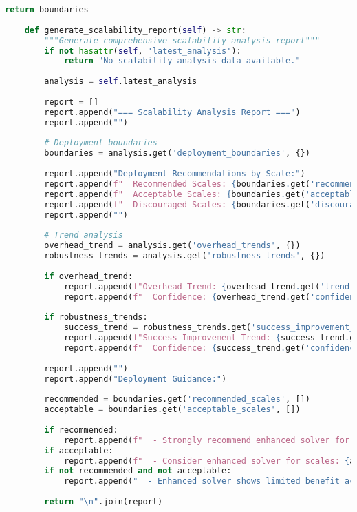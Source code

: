 \begin{lstlisting}[language=Python, caption=Scalability Analysis for Deployment Planning]
        return boundaries
    
    def generate_scalability_report(self) -> str:
        """Generate comprehensive scalability analysis report"""
        if not hasattr(self, 'latest_analysis'):
            return "No scalability analysis data available."
        
        analysis = self.latest_analysis
        
        report = []
        report.append("=== Scalability Analysis Report ===")
        report.append("")
        
        # Deployment boundaries
        boundaries = analysis.get('deployment_boundaries', {})
        
        report.append("Deployment Recommendations by Scale:")
        report.append(f"  Recommended Scales: {boundaries.get('recommended_scales', [])}")
        report.append(f"  Acceptable Scales: {boundaries.get('acceptable_scales', [])}")
        report.append(f"  Discouraged Scales: {boundaries.get('discouraged_scales', [])}")
        report.append("")
        
        # Trend analysis
        overhead_trend = analysis.get('overhead_trends', {})
        robustness_trends = analysis.get('robustness_trends', {})
        
        if overhead_trend:
            report.append(f"Overhead Trend: {overhead_trend.get('trend', 'unknown')}")
            report.append(f"  Confidence: {overhead_trend.get('confidence', 0.0):.2f}")
        
        if robustness_trends:
            success_trend = robustness_trends.get('success_improvement_trend', {})
            report.append(f"Success Improvement Trend: {success_trend.get('trend', 'unknown')}")
            report.append(f"  Confidence: {success_trend.get('confidence', 0.0):.2f}")
        
        report.append("")
        report.append("Deployment Guidance:")
        
        recommended = boundaries.get('recommended_scales', [])
        acceptable = boundaries.get('acceptable_scales', [])
        
        if recommended:
            report.append(f"  - Strongly recommend enhanced solver for scales: {recommended}")
        if acceptable:
            report.append(f"  - Consider enhanced solver for scales: {acceptable}")
        if not recommended and not acceptable:
            report.append("  - Enhanced solver shows limited benefit across tested scales")
        
        return "\n".join(report)
\end{lstlisting}

